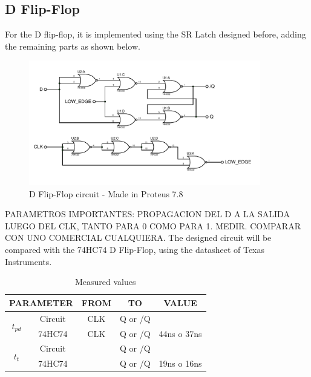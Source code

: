 \subsection*{D Flip-Flop}
For the D flip-flop, it is implemented using 
the SR Latch designed before, adding the 
remaining parts as shown below.

\begin{figure}[H]
    \begin{centering}
    \includegraphics[width=0.9\textwidth]{dflipflop}
    \par\end{centering}
    \caption{D Flip-Flop circuit - Made in Proteus 7.8}
\end{figure}

PARAMETROS IMPORTANTES: PROPAGACION DEL D A
LA SALIDA LUEGO DEL CLK, TANTO PARA 0 COMO
PARA 1. MEDIR. COMPARAR CON UNO COMERCIAL
CUALQUIERA.
The designed circuit will be compared with the 
74HC74 D Flip-Flop, using the datasheet of Texas 
Instruments.

\begin{table}[H]
    \begin{center}
        \begin{tabular}{|c|c|c|c|c|}
            \hline 
            \multicolumn{2}{|c|}{PARAMETER} & FROM & TO & VALUE\tabularnewline
            \hline 
            \hline 
            \multirow{2}{*}{$t_{pd}$} & Circuit & CLK & Q or /Q & \tabularnewline
            \cline{2-5} 
             & 74HC74 & CLK & Q or /Q & 44ns o 37ns\tabularnewline
            \hline 
            \multirow{2}{*}{$t_t$} & Circuit &  & Q or /Q & \tabularnewline
            \cline{2-5} 
             & 74HC74 &  & Q or /Q & 19ns o 16ns\tabularnewline
            \hline 
            \end{tabular}
    \caption{Measured values}
    \end{center}
\end{table}


